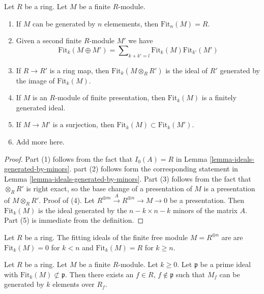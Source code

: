 \begin{lemma}
\label{lemma-fitting-ideal-basics}
Let $R$ be a ring. Let $M$ be a finite $R$-module.
\begin{enumerate}
\item If $M$ can be generated by $n$ elemements, then
$\text{Fit}_n(M) = R$.
\item Given a second finite $R$-module $M'$ we have
$$
\text{Fit}_k(M \oplus M') =
\sum\nolimits_{k + k' = l} \text{Fit}_k(M)\text{Fit}_{k'}(M')
$$
\item If $R \to R'$ is a ring map, then $\text{Fit}_k(M \otimes_R R')$
is the ideal of $R'$ generated by the image of $\text{Fit}_k(M)$.
\item If $M$ is an $R$-module of finite presentation, then $\text{Fit}_k(M)$
is a finitely generated ideal.
\item If $M \to M'$ is a surjection, then
$\text{Fit}_k(M) \subset \text{Fit}_k(M')$.
\item Add more here.
\end{enumerate}
\end{lemma}

\begin{proof}
Part (1) follows from the fact that $I_0(A) = R$ in
Lemma \ref{lemma-ideals-generated-by-minors}.
part (2) follows form the corresponding statement in
Lemma \ref{lemma-ideals-generated-by-minors}.
Part (3) follows from the fact that $\otimes_R R'$ is right exact,
so the base change of a presentation of $M$ is a presentation of
$M \otimes_R R'$.
Proof of (4). Let $R^{\oplus m} \xrightarrow{A} R^{\oplus n} \to M \to 0$
be a presentation. Then $\text{Fit}_k(M)$ is the ideal generated by the
$n - k \times n - k$ minors of the matrix $A$.
Part (5) is immediate from the definition.
\end{proof}

\begin{example}
\label{example-fitting-free}
Let $R$ be a ring.
The fitting ideals of the finite free module $M = R^{\oplus n}$ are
are $\text{Fit}_k(M) = 0$ for $k < n$ and $\text{Fit}_k(M) = R$
for $k \geq n$.
\end{example}

\begin{lemma}
\label{lemma-fitting-ideal-generate-locally}
Let $R$ be a ring. Let $M$ be a finite $R$-module. Let $k \geq 0$.
Let $\mathfrak p$ be a prime ideal with
$\text{Fit}_k(M) \not \subset \mathfrak p$. Then there exists
an $f \in R$, $f \not \in \mathfrak p$ such that $M_f$ can be
generated by $k$ elements over $R_f$.
\end{lemma}

